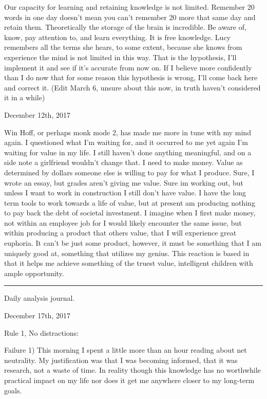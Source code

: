 Our capacity for learning and retaining knowledge is not limited.
Remember 20 words in one day doesn't mean you can't remember 20 more
that same day and retain them. Theoretically the storage of the brain is
incredible. Be aware of, know, pay attention to, and learn everything.
It is free knowledge. Lucy remembers all the terms she hears, to some
extent, because she knows from experience the mind is not limited in
this way. That is the hypothesis, I'll implement it and see if it's
accurate from now on. If I believe more confidently than I do now that
for some reason this hypothesis is wrong, I'll come back here and
correct it. (Edit March 6, unsure about this now, in truth haven't
considered it in a while)

\bigskip
\bigskip
December 12th, 2017

Win Hoff, or perhaps monk mode 2, has made me more in tune with my mind
again. I questioned what I'm waiting for, and it occurred to me yet
again I'm waiting for value in my life. I still haven't done anything
meaningful, and on a side note a girlfriend wouldn't change that. I need
to make money. Value as determined by dollars someone else is willing to
pay for what I produce. Sure, I wrote an essay, but grades aren't giving
me value. Sure im working out, but unless I want to work in construction
I still don't have value. I have the long term tools to work towards a
life of value, but at present am producing nothing to pay back the debt
of societal investment. I imagine when I first make money, not within an
employee job for I would likely encounter the same issue, but within
producing a product that others value, that I will experience great
euphoria. It can't be just some product, however, it must be something
that I am uniquely good at, something that utilizes my genius. This
reaction is based in that it helps me achieve something of the truest
value, intelligent children with ample opportunity.

\begin{center}\rule{0.5\linewidth}{\linethickness}\end{center}

Daily analysis journal.

\bigskip
\bigskip
December 17th, 2017

Rule 1, No distractions:

Failure 1) This morning I spent a little more than an hour reading about
net neutrality. My justification was that I was becoming informed, that
it was research, not a waste of time. In reality though this knowledge
has no worthwhile practical impact on my life nor does it get me
anywhere closer to my long-term goals.

